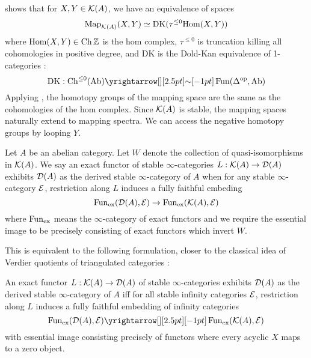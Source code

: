 \documentclass{article}
\begin{document}
shows that for $X , Y \in \mathcal{K}(A)$,
we have an equivalence of spaces \[
  \mathrm{Map}_{\mathcal{K}(A)}(X , Y) \simeq \mathrm{DK}(\tau^{\leq 0} {\mathrm{Hom}}(X, Y))
\]
where $\mathrm{Hom}(X , Y) \in \mathrm{Ch}\,\mathbb{Z}$ is the hom complex,
$\tau^{\leq 0}$ is truncation killing all cohomologies in positive degree, 
and $\mathrm{DK}$ is the Dold-Kan equivalence
of 1-categories : \[
  \mathrm{DK} : \CH^{\leq 0}(\AB) \map{\sim}{} \FUN(\De^{\OP} , \AB)
\]
Applying \cite[Remark 1.2.3.14]{lurie-HA}, the homotopy groups
of the mapping space are the same as the cohomologies of the hom complex.
Since $\mathcal{K}(A)$ is stable,
the mapping spaces naturally extend to mapping spectra.
We can access the negative homotopy groups by looping $Y$.
  
\begin{dfn}\cite[Definition 1.3.4.1]{lurie-HA}
  Let $A$ be an abelian category.
  Let $W$ denote the collection of quasi-isomorphisms in $\mathcal{K}(A)$.
  We say an exact functor of stable $\infty$-categories 
  $L : \mathcal{K}(A) \to \mathcal{D}(A)$
  exhibits $\mathcal{D}(A)$ as the derived stable $\infty$-category of $A$ when
  for any stable $\infty$-category $\mathcal{E}$,
  restriction along $L$ induces a fully faithful embeding \[
    \operatorname{Fun}_{\mathrm{ex}}(\mathcal{D}(A) , \mathcal{E}) \to \operatorname{Fun}_{\mathrm{ex}}(\mathcal{K}(A) , \mathcal{E})
  \]
  where $\operatorname{Fun}_{\mathrm{ex}}$ means the $\infty$-category of exact functors
  and we require the essential image to be precisely
  consisting of exact functors which invert $W$.
\end{dfn}
This is equivalent to the following formulation,
closer to the classical idea of Verdier quotients of triangulated categories : 
\begin{prop}
  An exact functor $L : \mathcal{K}(A) \to \mathcal{D}(A)$ of stable $\infty$-categories
  exhibits $\mathcal{D}(A)$ as the derived stable $\infty$-category of $A$
  iff for all stable infinity categories $\mathcal{E}$,
  restriction along $L$ induces 
  a fully faithful embedding of infinity categories \[
    \FUN_{\mathrm{ex}}(\cD(A), \cE) \map{}{}
    \FUN_{\mathrm{ex}}(\cK(A) , \cE)
  \]
  with essential image consisting precisely of 
  functors where every acyclic $X$ maps to a zero object.
\end{prop}
\end{document}
